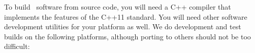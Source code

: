 
To build \OOMMF\ software from source code, you will
need a C++ compiler 
that implements the features of the C++11 standard.
You will need other software
development utilities for your platform as well.  
We do development and
test builds on the following platforms, although porting to others
should not be too difficult:

